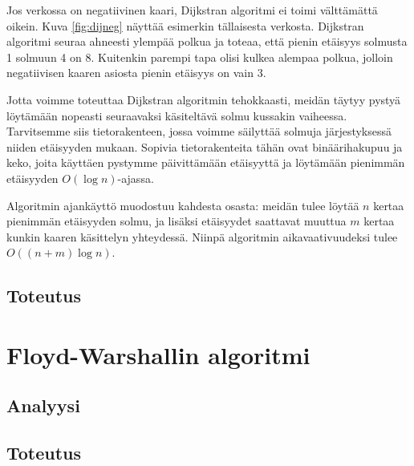 Jos verkossa on negatiivinen kaari,
Dijkstran algoritmi ei toimi välttä\-mättä oikein.
Kuva \ref{fig:dijneg} näyttää esimerkin tällaisesta verkosta.
Dijkstran algoritmi seuraa ahneesti ylempää polkua ja toteaa,
että pienin etäisyys solmusta 1 solmuun 4 on 8.
Kuitenkin parempi tapa olisi kulkea alempaa polkua,
jolloin negatiivisen kaaren asiosta pienin etäisyys on vain 3.

Jotta voimme toteuttaa Dijkstran algoritmin tehokkaasti,
meidän täytyy pystyä löytämään nopeasti seuraavaksi käsiteltävä
solmu kussakin vaiheessa.
Tarvitsemme siis tietorakenteen, jossa voimme säilyttää
solmuja järjestykses\-sä niiden etäisyyden mukaan.
Sopivia tietorakenteita tähän ovat binääri\-hakupuu ja keko,
joita käyttäen pystymme päivittämään etäisyyttä ja löytämään
pienimmän etäisyyden $O(\log n)$-ajassa.

Algoritmin ajankäyttö muodostuu kahdesta osasta:
meidän tulee löytää $n$ kertaa pienimmän etäisyyden solmu,
ja lisäksi etäisyydet saattavat muuttua $m$ kertaa
kunkin kaaren käsittelyn yhteydessä.
Niinpä algoritmin aikavaativuudeksi tulee $O((n+m) \log n)$.

\subsection{Toteutus}

\section{Floyd-Warshallin algoritmi}

\subsection{Analyysi}

\subsection{Toteutus}
